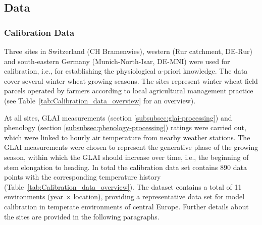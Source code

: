 \subsection{Data}
\subsubsection{Calibration Data}
\label{subsec:calibration-data}

Three sites in Switzerland (CH Bramenwies), western (Rur catchment, DE-Rur) and south-eastern Germany (Munich-North-Isar, DE-MNI) were used for calibration, i.e., for establishing the physiological a-priori knowledge. The data cover several winter wheat growing seasons. The sites represent winter wheat field parcels operated by farmers according to local agricultural management practice (see Table~\ref{tab:Calibration_data_overview} for an overview).

At all sites, \gls{GLAI} measurements (section \ref{subsubsec:glai-processing}) and phenology (section \ref{subsubsec:phenology-processing}) ratings were carried out, which were linked to hourly air temperature from nearby weather stations. The \gls{GLAI} measurements were chosen to represent the generative phase of the growing season, within which the \gls{GLAI} should increase over time, i.e., the beginning of stem elongation to heading. In total the calibration data set contains 890 data points with the corresponding temperature history (Table~\ref{tab:Calibration_data_overview}). The dataset contains a total of 11 environments (year $\times$ location), providing a representative data set for model calibration in temperate environments of central Europe. Further details about the sites are provided in the following paragraphs.


